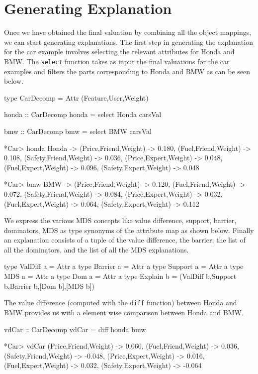 \documentclass{jfp}
\newcommand{\prog}[1]{\texttt{#1}}
\begin{document}
\section{Generating Explanation}
Once we have obtained the final valuation by combining all the object mappings, we can start generating explanations. The first step in generating the explanation for the car example involves selecting the relevant attributes for Honda and BMW. The \prog{select} function takes as input the final valuations for the car examples and filters the parts corresponding to Honda and BMW as can be seen below.
\begin{haskellcode}
type CarDecomp = Attr (Feature,User,Weight)

honda :: CarDecomp
honda = select Honda carsVal

bmw :: CarDecomp
bmw = select BMW carsVal

*Car> honda
{Honda -> {(Price,Friend,Weight) -> 0.180,
           (Fuel,Friend,Weight) -> 0.108,
           (Safety,Friend,Weight) -> 0.036,
           (Price,Expert,Weight) -> 0.048,
           (Fuel,Expert,Weight) -> 0.096,
           (Safety,Expert,Weight) -> 0.048}}
 
*Car> bmw
 {BMW -> {(Price,Friend,Weight) -> 0.120,
          (Fuel,Friend,Weight) -> 0.072,
          (Safety,Friend,Weight) -> 0.084,
          (Price,Expert,Weight) -> 0.032,
          (Fuel,Expert,Weight) -> 0.064,
          (Safety,Expert,Weight) -> 0.112}}
\end{haskellcode}
We express the various MDS concepts like value difference, support, barrier, dominators, MDS as type synonyms of the attribute map as shown below. Finally an explanation consists of a tuple of the value difference, the barrier, the list of all the dominators, and the list of all the MDS explanations. 
\begin{haskellcode}
type ValDiff a = Attr a 
type Barrier a = Attr a 
type Support a = Attr a 
type MDS a = Attr a
type Dom a = Attr a 
type Explain b = (ValDiff b,Support b,Barrier b,[Dom b],[MDS b])
\end{haskellcode}
The value difference (computed with the \prog{diff} function) between Honda and BMW provides us with a element wise comparison between Honda and BMW. 
\begin{haskellcode}
vdCar :: CarDecomp
vdCar = diff honda bmw

*Car> vdCar
{(Price,Friend,Weight) -> 0.060,
 (Fuel,Friend,Weight) -> 0.036,
 (Safety,Friend,Weight) -> -0.048,
 (Price,Expert,Weight) -> 0.016,
 (Fuel,Expert,Weight) -> 0.032,
 (Safety,Expert,Weight) -> -0.064}
\end{haskellcode}
\end{document}
